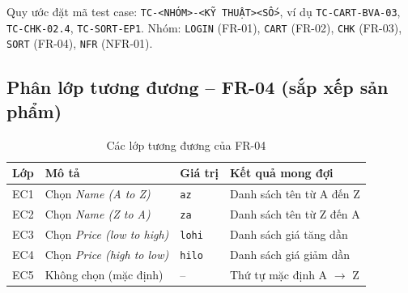 \documentclass[12pt,a4paper]{article}
\newcommand{\tablestyle}{\small\renewcommand{\arraystretch}{1.25}}
\newcommand{\hrow}{\rowcolor{tablehead}}
\begin{document}
Quy ước đặt mã test case: \texttt{TC-<NHÓM>-<KỸ THUẬT><SỐ>}, ví dụ \texttt{TC-CART-BVA-03},
\texttt{TC-CHK-02.4}, \texttt{TC-SORT-EP1}. Nhóm: \texttt{LOGIN} (FR-01), \texttt{CART} (FR-02),
\texttt{CHK} (FR-03), \texttt{SORT} (FR-04), \texttt{NFR} (NFR-01).

\subsection{Phân lớp tương đương -- FR-04 (sắp xếp sản phẩm)}
\begin{table}[H]
\centering
\tablestyle
\caption{Các lớp tương đương của FR-04}
\label{tab:ep-sort}
\begin{tabularx}{\textwidth}{L{1.4cm}YL{1.8cm}Y}
\toprule
\hrow \textbf{Lớp} & \textbf{Mô tả} & \textbf{Giá trị} & \textbf{Kết quả mong đợi} \\
\midrule
EC1 & Chọn \textit{Name (A to Z)} & \texttt{az} & Danh sách tên từ A đến Z \\
EC2 & Chọn \textit{Name (Z to A)} & \texttt{za} & Danh sách tên từ Z đến A \\
EC3 & Chọn \textit{Price (low to high)} & \texttt{lohi} & Danh sách giá tăng dần \\
EC4 & Chọn \textit{Price (high to low)} & \texttt{hilo} & Danh sách giá giảm dần \\
EC5 & Không chọn (mặc định) & -- & Thứ tự mặc định A $\rightarrow$ Z \\
\bottomrule
\end{tabularx}
\end{table}
\end{document}
